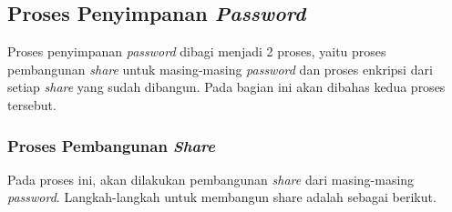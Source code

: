 \subsection{Proses Penyimpanan \textit{Password}}\label{subsec:simpanpassword}

Proses penyimpanan \textit{password} dibagi menjadi 2 proses, yaitu proses pembangunan \textit{share} untuk masing-masing \textit{password} dan proses enkripsi dari setiap \textit{share} yang sudah dibangun. Pada bagian ini akan dibahas kedua proses tersebut.

\subsubsection{Proses Pembangunan \textit{Share}}

Pada proses ini, akan dilakukan pembangunan \textit{share} dari masing-masing \textit{password}. Langkah-langkah untuk membangun share adalah sebagai berikut.

